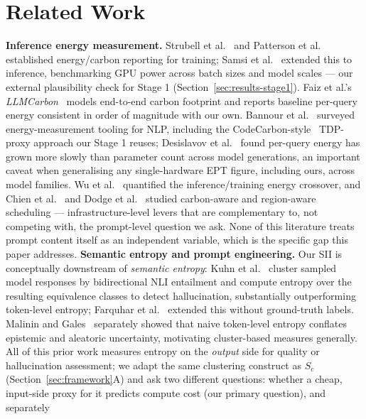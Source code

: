 \documentclass[conference]{IEEEtran}
\begin{document}
\section{Related Work}
\label{sec:related}
\textbf{Inference energy measurement.} Strubell et
al.~\cite{strubell2019energy} and Patterson et
al.~\cite{patterson2022carbon} established energy/carbon reporting for
training; Samsi et al.~\cite{samsi2023words} extended this to
inference, benchmarking GPU power across batch sizes and model scales
--- our external plausibility check for Stage 1
(Section~\ref{sec:results-stage1}). Faiz et al.'s
\emph{LLMCarbon}~\cite{faiz2024llmcarbon} models end-to-end carbon
footprint and reports baseline per-query energy consistent in order of
magnitude with our own. Bannour et al.~\cite{bannour2021evaluating}
surveyed energy-measurement tooling for NLP, including the
CodeCarbon-style~\cite{lacoste2019quantifying} TDP-proxy approach our
Stage 1 reuses; Desislavov et al.~\cite{desislavov2023trends} found
per-query energy has grown more slowly than parameter count across
model generations, an important caveat when generalising any
single-hardware EPT figure, including ours, across model families.
Wu et al.~\cite{wu2022sustainable} quantified the inference/training
energy crossover, and Chien et al.~\cite{chien2023reducing} and Dodge
et al.~\cite{dodge2022measuring} studied carbon-aware and
region-aware scheduling --- infrastructure-level levers that are
complementary to, not competing with, the prompt-level question we
ask. None of this literature treats prompt content itself as an
independent variable, which is the specific gap this paper addresses.
\textbf{Semantic entropy and prompt engineering.} Our SII is
conceptually downstream of \emph{semantic entropy}: Kuhn et
al.~\cite{kuhn2023semantic} cluster sampled model responses by
bidirectional NLI entailment and compute entropy over the resulting
equivalence classes to detect hallucination, substantially
outperforming token-level entropy; Farquhar et
al.~\cite{farquhar2024detecting} extended this without ground-truth
labels. Malinin and Gales~\cite{malinin2021uncertainty} separately
showed that naive token-level entropy conflates epistemic and
aleatoric uncertainty, motivating cluster-based measures generally.
All of this prior work measures entropy on the \emph{output} side for
quality or hallucination assessment; we adapt the same clustering
construct as $S_c$ (Section~\ref{sec:framework}A) and ask two
different questions: whether a cheap, input-side proxy for it predicts
compute cost (our primary question), and separately
\end{document}
